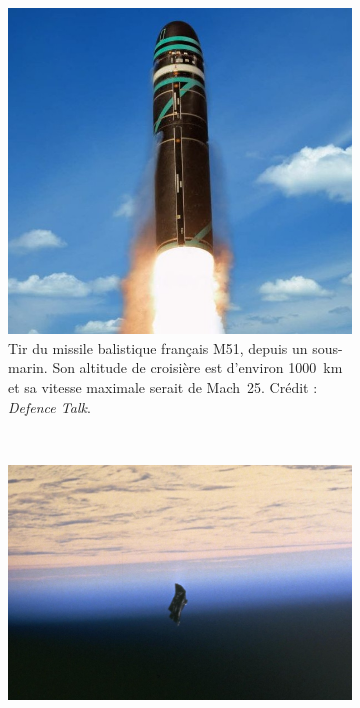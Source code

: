 	
	\begin{figure}[!htbp]
        \begin{subfigure}[t]{0.41\textwidth}
            \centering
            \includegraphics[width=\textwidth]{figures/ch1/m51}
        	\caption[Missile français M51]{Tir du missile balistique français M51, depuis un sous-marin. Son altitude de croisière est d'environ 1000~km et sa vitesse maximale serait de Mach~25\footnotemark. Crédit : \emph{Defence Talk}\footnotemark.}
            \label{fig:m51}
        \end{subfigure}
        ~
        \begin{subfigure}[t]{0.57\textwidth}
            \centering
            \includegraphics[width=\textwidth]{figures/ch1/space_debris_zoom}

\end{subfigure}
\end{figure}
